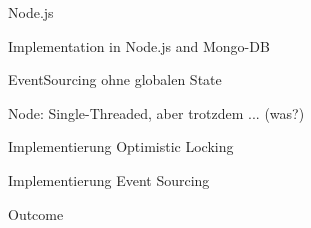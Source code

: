 \begin{frame}[fragile]{Node.js}
\hfill 

\begin{tiny}
\end{tiny}

\end{frame}




\begin{frame}[fragile]{}

Implementation in Node.js and Mongo-DB

\end{frame}

\begin{frame}[fragile]{}

EventSourcing ohne globalen State

\end{frame}

\begin{frame}[fragile]{}

Node: Single-Threaded, aber trotzdem ... (was?)

\end{frame}

\begin{frame}[fragile]{}

Implementierung Optimistic Locking

\end{frame}

\begin{frame}[fragile]{}

Implementierung Event Sourcing

\end{frame}

\begin{frame}[fragile]{}

{
\LARGE

Outcome
}

\end{frame}

